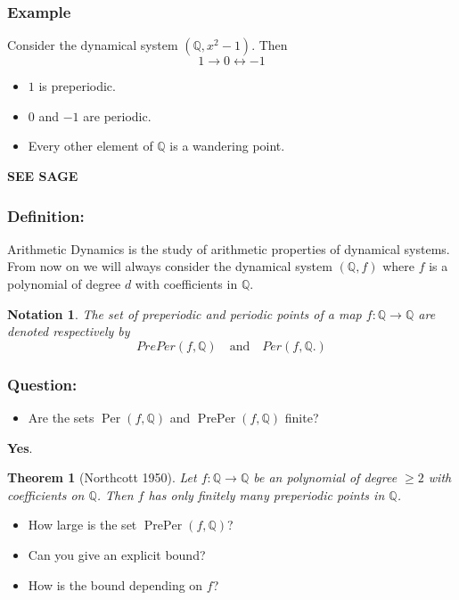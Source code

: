 \documentclass{beamer}
\def\jump{ \quad \\ \vspace{0.7cm} \pause}
\def\QQ{{\mathbb Q}}
\DeclareMathOperator{\Per}{Per}
\DeclareMathOperator{\PrePer}{PrePer}
\theoremstyle{thmstyle}
\theoremstyle{thmstyle}
\newtheorem*{mythm}{Theorem}
\theoremstyle{thmstyle}
\newtheorem*{mynot}{Notation}
\theoremstyle{mystyle}
\theoremstyle{qstnstyle}
\begin{document}
\begin{frame}
\frametitle{Example}
Consider the dynamical system $\displaystyle\left(\QQ,x^2-1\right)$. Then 
\vspace{5mm}
$$1 \longrightarrow 0 \longleftrightarrow -1  $$
\vspace{5mm}

\begin{itemize}
\item $1$ is preperiodic.
\vspace{2mm}
\item $0$ and $-1$ are periodic.
\vspace{2mm}
\item Every other element of $\QQ$ is a wandering point.
\end{itemize}

\pause
\textbf{SEE SAGE}
\end{frame}

\begin{frame}
\frametitle{Definition:}
Arithmetic Dynamics is the study of arithmetic properties of dynamical systems. 
\jump
From now on we will always consider the dynamical system $(\QQ,f)$ where $f$ is a polynomial of degree $d$ with coefficients in $\QQ$.
\jump
\begin{mynot}
The set of preperiodic and periodic points of a map $f:\QQ \to \QQ$ are denoted respectively by
$$PrePer(f,\QQ) \quad \mbox{and}\quad Per(f,\QQ.) $$
\end{mynot}
 
\end{frame}

\begin{frame}
\frametitle{Question:}
\begin{itemize}
\item Are the sets $\Per(f,\QQ)$ and $\PrePer(f,\QQ)$ finite? 
\end{itemize}

\pause \textbf{Yes}. 
\vspace{6mm}\pause

\begin{mythm}[Northcott 1950]
Let $f : \QQ \to \QQ$ be an polynomial of degree $\geq{2}$ with coefficients on $\QQ$. Then $f$ has
only finitely many preperiodic points in $\QQ$.
\end{mythm}

\pause \vspace{3mm}
\begin{itemize}
\item How large is the set $\PrePer(f,\QQ)$? 
\item Can you give an explicit bound?
\item How is the bound depending on $f$? 
\end{itemize}



\end{frame}
\end{document}
